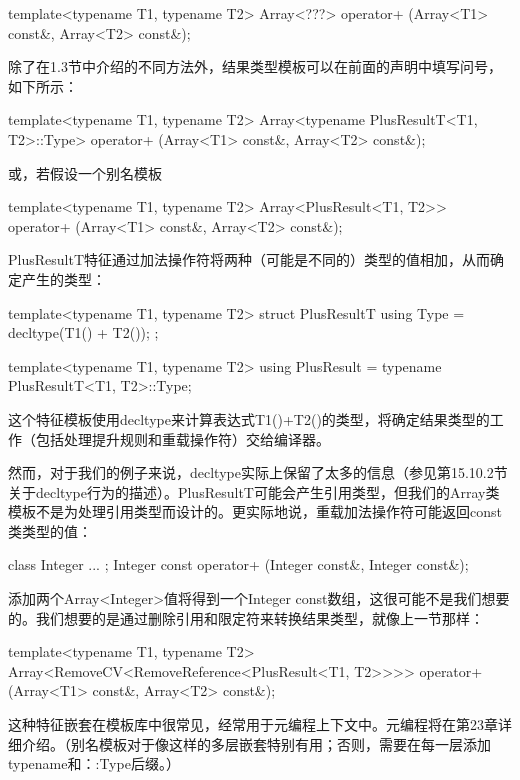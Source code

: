 \begin{cpp}
template<typename T1, typename T2>
Array<???> operator+ (Array<T1> const&, Array<T2> const&);
\end{cpp}

除了在1.3节中介绍的不同方法外，结果类型模板可以在前面的声明中填写问号，如下所示：

\begin{cpp}
template<typename T1, typename T2>
Array<typename PlusResultT<T1, T2>::Type>
operator+ (Array<T1> const&, Array<T2> const&);
\end{cpp}

或，若假设一个别名模板

\begin{cpp}
template<typename T1, typename T2>
Array<PlusResult<T1, T2>>
operator+ (Array<T1> const&, Array<T2> const&);
\end{cpp}

PlusResultT特征通过加法操作符将两种（可能是不同的）类型的值相加，从而确定产生的类型：

\begin{cpp}
template<typename T1, typename T2>
struct PlusResultT {
	using Type = decltype(T1() + T2());
};

template<typename T1, typename T2>
using PlusResult = typename PlusResultT<T1, T2>::Type;
\end{cpp}

这个特征模板使用decltype来计算表达式T1()+T2()的类型，将确定结果类型的工作（包括处理提升规则和重载操作符）交给编译器。

然而，对于我们的例子来说，decltype实际上保留了太多的信息（参见第15.10.2节关于decltype行为的描述）。PlusResultT可能会产生引用类型，但我们的Array类模板不是为处理引用类型而设计的。更实际地说，重载加法操作符可能返回const类类型的值：

\begin{cpp}
class Integer { ... };
Integer const operator+ (Integer const&, Integer const&);
\end{cpp}

添加两个Array<Integer>值将得到一个Integer const数组，这很可能不是我们想要的。我们想要的是通过删除引用和限定符来转换结果类型，就像上一节那样：

\begin{cpp}
template<typename T1, typename T2>
Array<RemoveCV<RemoveReference<PlusResult<T1, T2>>>>
operator+ (Array<T1> const&, Array<T2> const&);
\end{cpp}

这种特征嵌套在模板库中很常见，经常用于元编程上下文中。元编程将在第23章详细介绍。（别名模板对于像这样的多层嵌套特别有用；否则，需要在每一层添加typename和：:Type后缀。）

